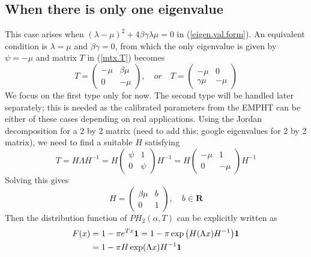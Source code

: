 \documentclass[11pt]{article}
\begin{document}
\subsection{When there is only one eigenvalue}
This case arises when $(\lambda-\mu)^2+4\beta \gamma \lambda \mu =0$ in (\ref{eigen.val.form}). An equivalent condition is $\lambda=\mu$ and $\beta \gamma =0$, from which the only eigenvalue is given by $\psi=-\mu$ and matrix $T$ in (\ref{mtx.T}) becomes
\begin{equation}
\label{T.two.vers}
T=\begin{pmatrix}
  -\mu    & \beta \mu   \\
     0 & -\mu
\end{pmatrix}, \quad or \quad T=\begin{pmatrix}
  -\mu    & 0   \\
     \gamma \mu & -\mu 
\end{pmatrix}
\end{equation} 
We focus on the first type only for now. The second type will be handled later separately; this is needed as the calibrated parameters from the EMPHT can be either of these cases depending on real applications. Using the Jordan decomposition for a 2 by 2 matrix (need to add this; google eigenvalues for 2 by 2 matrix), we need to find a suitable $H$ satisfying
\begin{equation}
\label{ }
T=H\Lambda H^{-1}=H\begin{pmatrix}
  \psi    & 1   \\
     0 & \psi 
\end{pmatrix} H^{-1}=H\begin{pmatrix}
  -\mu    & 1   \\
     0 & -\mu
\end{pmatrix} H^{-1}
\end{equation}
Solving this gives 
\begin{equation}
\label{ }H=
\begin{pmatrix}
    \beta \mu  & b   \\
     0 & 1 
\end{pmatrix}, \quad  b \in \mathbf{ R}
\end{equation}
Then the distribution function of $PH_2(\alpha, T)$ can be explicitly written as
\begin{align}
\label{}
F(x)&=1-\pi e^{Tx}\mathbf{ 1}=  1-\pi \exp \big{(}H(\Lambda x)H^{-1}\big{)}\mathbf{ 1} \\
    & = 1-\pi H \exp (\Lambda x) H^{-1} \mathbf{ 1}
\end{align}
\end{document}
